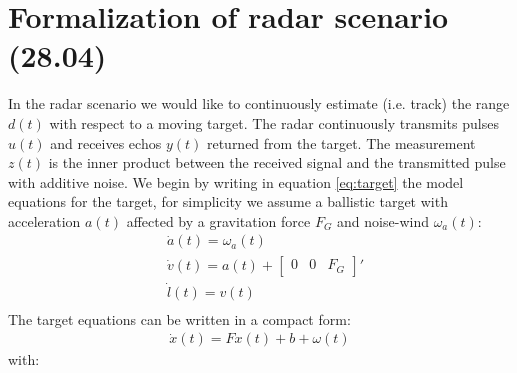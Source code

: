 \documentclass[oneside,12pt]{article}
\begin{document}
\section{Formalization of radar scenario (28.04)}\label{sec:Radar_problem}
%
In the radar scenario we would like to continuously estimate (i.e. track) the range $d(t)$ with respect to a moving target. The radar continuously transmits pulses $u(t)$ and receives echos $y(t)$ returned from the target. The measurement $z(t)$ is the inner product between the received signal and the transmitted pulse with additive noise. We begin by writing in equation \ref{eq:target} the model equations for the target, for simplicity we assume a ballistic target with acceleration $a(t)$ affected by a gravitation force $F_G$ and noise-wind $\omega_a(t)$:
%
\begin{equation}\label{eq:target}
    \begin{split}
        &\dot{a}(t) = \omega_a(t)\\
        &\dot{v}(t) = a(t) + {\begin{bmatrix} 0 & 0 & F_G \end{bmatrix}}'\\
        &\dot{l}(t) = v(t)\\
    \end{split}
\end{equation}
%
The target equations can be written in a compact form:
%
\begin{equation}\label{eq:target_mat}
    \begin{split}
        \dot{x}(t) = Fx(t) + b + \omega(t)
    \end{split}
\end{equation}
%
with:
%
\end{document}
